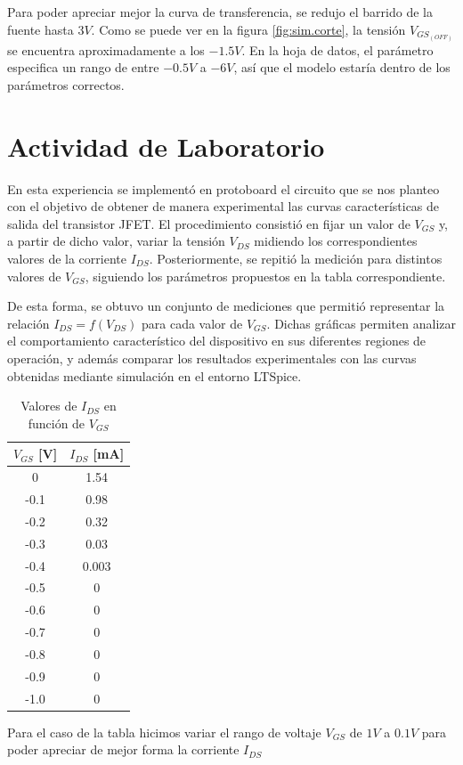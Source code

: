     Para poder apreciar mejor la curva de transferencia, se redujo el barrido de la fuente hasta $3V$. Como se puede ver
    en la figura \ref{fig:sim.corte}, la tensión $V_{GS_{(OFF)}}$ se encuentra aproximadamente a los $-1.5V$. En la hoja
    de datos, el parámetro especifica un rango de entre $-0.5V$ a $-6V$, así que el modelo estaría dentro de los
    parámetros correctos.

  \section{Actividad de Laboratorio}

      

     En esta experiencia se implementó en protoboard el circuito que se nos planteo 
    con el objetivo de obtener de manera experimental las curvas características de salida del transistor JFET. 
    El procedimiento consistió en fijar un valor de $V_{GS}$ y, a partir de dicho valor, variar la tensión 
    $V_{DS}$ midiendo los correspondientes valores de la corriente $I_{DS}$. Posteriormente, se repitió la 
    medición para distintos valores de $V_{GS}$, siguiendo los parámetros propuestos en la tabla correspondiente.
    
    De esta forma, se obtuvo un conjunto de mediciones que permitió representar la relación 
    $I_{DS} = f(V_{DS})$ para cada valor de $V_{GS}$. Dichas gráficas permiten analizar el comportamiento 
    característico del dispositivo en sus diferentes regiones de operación, y además comparar los resultados 
    experimentales con las curvas obtenidas mediante simulación en el entorno LTSpice.

    \begin{table}[H]
        \centering
        \begin{tabular}{|c|c|}
        \hline
        \textbf{$V_{GS}$ [V]} & \textbf{$I_{DS}$ [mA]} \\ \hline
        0     & 1.54  \\ \hline
        -0.1  & 0.98  \\ \hline
        -0.2  & 0.32  \\ \hline
        -0.3  & 0.03  \\ \hline
        -0.4  & 0.003 \\ \hline
        -0.5  & 0     \\ \hline
        -0.6  & 0     \\ \hline
        -0.7  & 0     \\ \hline
        -0.8  & 0     \\ \hline
        -0.9  & 0     \\ \hline
        -1.0  & 0     \\ \hline
        \end{tabular}
        \caption{Valores de $I_{DS}$ en función de $V_{GS}$}
        \label{tab:ids-vgs}
        \end{table}


    Para el caso de la tabla hicimos variar el rango de voltaje $V_{GS}$ de $1V$ a $0.1V$ para poder apreciar de mejor forma la corriente $I_{DS}$ 
